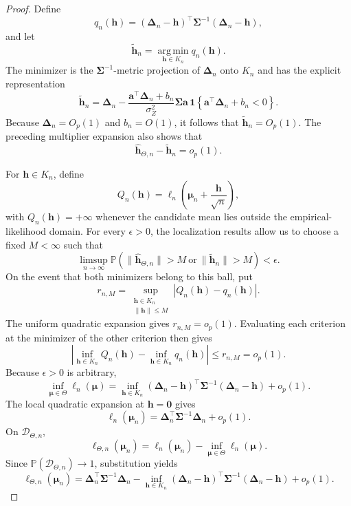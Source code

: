 \documentclass[11pt]{article}
\theoremstyle{remark}
\begin{document}
\begin{proof}
Define
$$q_n(\boldsymbol{h})=(\boldsymbol{\Delta}_n-\boldsymbol{h})^{\top}\boldsymbol{\Sigma}^{-1}(\boldsymbol{\Delta}_n-\boldsymbol{h}),$$
and let
$$\widetilde{\boldsymbol{h}}_n=\operatorname*{arg\,min}_{\boldsymbol{h}\in K_n}q_n(\boldsymbol{h}).$$
The minimizer is the $\boldsymbol{\Sigma}^{-1}$-metric projection of $\boldsymbol{\Delta}_n$ onto $K_n$ and has the explicit representation
$$\widetilde{\boldsymbol{h}}_n=\boldsymbol{\Delta}_n-\frac{\boldsymbol{a}^{\top}\boldsymbol{\Delta}_n+b_n}{\sigma_Z^2}\boldsymbol{\Sigma}\boldsymbol{a}\,\mathbf{1}\left\{\boldsymbol{a}^{\top}\boldsymbol{\Delta}_n+b_n<0\right\}.$$
Because $\boldsymbol{\Delta}_n=O_p(1)$ and $b_n=O(1)$, it follows that $\widetilde{\boldsymbol{h}}_n=O_p(1)$. The preceding multiplier expansion also shows that
$$\widehat{\boldsymbol{h}}_{\Theta,n}-\widetilde{\boldsymbol{h}}_n=o_p(1).$$

For $\boldsymbol{h}\in K_n$, define
$$Q_n(\boldsymbol{h})=\ell_n\left(\boldsymbol{\mu}_n+\frac{\boldsymbol{h}}{\sqrt{n}}\right),$$
with $Q_n(\boldsymbol{h})=+\infty$ whenever the candidate mean lies outside the empirical-likelihood domain. For every $\epsilon>0$, the localization results allow us to choose a fixed $M<\infty$ such that
$$\limsup_{n\to\infty}\mathbb{P}\left(\|\widehat{\boldsymbol{h}}_{\Theta,n}\|>M\ \text{or}\ \|\widetilde{\boldsymbol{h}}_n\|>M\right)<\epsilon.$$
On the event that both minimizers belong to this ball, put
$$r_{n,M}=\sup_{\substack{\boldsymbol{h}\in K_n\\ \|\boldsymbol{h}\|\leq M}}|Q_n(\boldsymbol{h})-q_n(\boldsymbol{h})|.$$
The uniform quadratic expansion gives $r_{n,M}=o_p(1)$. Evaluating each criterion at the minimizer of the other criterion then gives
$$\left|\inf_{\boldsymbol{h}\in K_n}Q_n(\boldsymbol{h})-\inf_{\boldsymbol{h}\in K_n}q_n(\boldsymbol{h})\right|\leq r_{n,M}=o_p(1).$$
Because $\epsilon>0$ is arbitrary,
$$\inf_{\boldsymbol{\mu}\in\Theta}\ell_n(\boldsymbol{\mu})=\inf_{\boldsymbol{h}\in K_n}(\boldsymbol{\Delta}_n-\boldsymbol{h})^{\top}\boldsymbol{\Sigma}^{-1}(\boldsymbol{\Delta}_n-\boldsymbol{h})+o_p(1).$$
The local quadratic expansion at $\boldsymbol{h}=\boldsymbol{0}$ gives
$$\ell_n(\boldsymbol{\mu}_n)=\boldsymbol{\Delta}_n^{\top}\boldsymbol{\Sigma}^{-1}\boldsymbol{\Delta}_n+o_p(1).$$
On $\mathcal{D}_{\Theta,n}$,
$$\ell_{\Theta,n}(\boldsymbol{\mu}_n)=\ell_n(\boldsymbol{\mu}_n)-\inf_{\boldsymbol{\mu}\in\Theta}\ell_n(\boldsymbol{\mu}).$$
Since $\mathbb{P}(\mathcal{D}_{\Theta,n})\to1$, substitution yields
$$\ell_{\Theta,n}(\boldsymbol{\mu}_n)=\boldsymbol{\Delta}_n^{\top}\boldsymbol{\Sigma}^{-1}\boldsymbol{\Delta}_n-\inf_{\boldsymbol{h}\in K_n}(\boldsymbol{\Delta}_n-\boldsymbol{h})^{\top}\boldsymbol{\Sigma}^{-1}(\boldsymbol{\Delta}_n-\boldsymbol{h})+o_p(1).$$


\end{proof}
\end{document}
